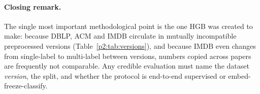 \paragraph{Closing remark.} The single most important methodological point is the one HGB was
created to make: because DBLP, ACM and IMDB circulate in mutually incompatible preprocessed
versions (Table~\ref{p2:tab:versions}), and because IMDB even changes from single-label to
multi-label between versions, numbers copied across papers are frequently not comparable. Any
credible evaluation must name the dataset \emph{version}, the split, and whether the protocol is
end-to-end supervised or embed-freeze-classify.
